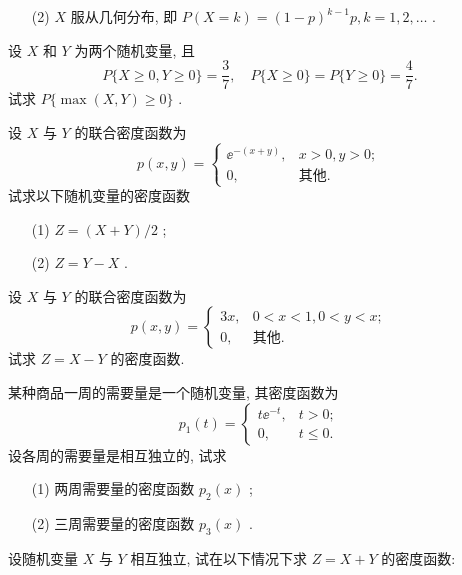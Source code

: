 \begin{xiti}
\begin{enumerate}
      	\item[(2)] $X$ 服从几何分布, 即 $P(X=k)=(1-p)^{k-1}p,k=1,2,\ldots$ .
      \end{enumerate}
      \item 设 $X$ 和 $Y$ 为两个随机变量, 且
      \begin{equation*}
      	P\{X\geqslant0,Y\geqslant0\}=\frac{3}{7},\quad P\{X\geqslant0\}=P\{Y\geqslant0\}=\frac{4}{7}.
      \end{equation*}
      试求 $P\{\max(X,Y)\geqslant0\}$ .
      \item 设 $X$ 与 $Y$ 的联合密度函数为
      \begin{equation*}
      	p(x,y)=\begin{cases}
      	\ee^{-(x+y)}, & x>0,y>0;\\
      	0, & \text{其他}.
      	\end{cases}
      \end{equation*}
      试求以下随机变量的密度函数
      \begin{enumerate}
      	\item[(1)] $Z=(X+Y)/2$ ;
      	\item[(2)] $Z=Y-X$ .
      \end{enumerate}
      \item 设 $X$ 与 $Y$ 的联合密度函数为
      \begin{equation*}
      	p(x,y)=\begin{cases}
      	3x, & 0<x<1,0<y<x;\\
      	0, & \text{其他}.
      	\end{cases}
      \end{equation*}
      试求 $Z=X-Y$ 的密度函数.
      \item 某种商品一周的需要量是一个随机变量, 其密度函数为
      \begin{equation*}
      	p_{1}(t)=\begin{cases}
      	t\ee^{-t}, & t>0;\\
      	0, & t\leqslant0.
      	\end{cases}
      \end{equation*}
      设各周的需要量是相互独立的, 试求
      \begin{enumerate}
      	\item[(1)] 两周需要量的密度函数 $p_{2}(x)$ ;
      	\item[(2)] 三周需要量的密度函数 $p_{3}(x)$ .
      \end{enumerate}
      \item 设随机变量 $X$ 与 $Y$ 相互独立, 试在以下情况下求 $Z=X+Y$ 的密度函数:

\end{xiti}
